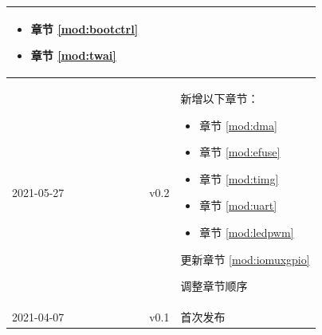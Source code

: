 \begin{longtable}[l]{ | m{2cm} | m{1.5cm} | m{12cm} | }
\begin{itemize}
                \item 章节 \ref{mod:bootctrl} \textit{\nameref{mod:bootctrl}}
                \item 章节 \ref{mod:twai} \textit{\nameref{mod:twai}}
            \end{itemize}
\\\hline
    2021-05-27 & v0.2 &
        新增以下章节：
            \begin{itemize}
                \item 章节 \ref{mod:dma} \textit{\nameref{mod:dma}}
                \item 章节 \ref{mod:efuse} \textit{\nameref{mod:efuse}}
                \item 章节 \ref{mod:timg} \textit{\nameref{mod:timg}}
                \item 章节 \ref{mod:uart} \textit{\nameref{mod:uart}}
                \item 章节 \ref{mod:ledpwm} \textit{\nameref{mod:ledpwm}}
            \end{itemize}

        更新章节 \ref{mod:iomuxgpio} \textit{\nameref{mod:iomuxgpio}}

        调整章节顺序
 \\\hline
    2021-04-07 & v0.1 & 首次发布\\\hline
\end{longtable}

